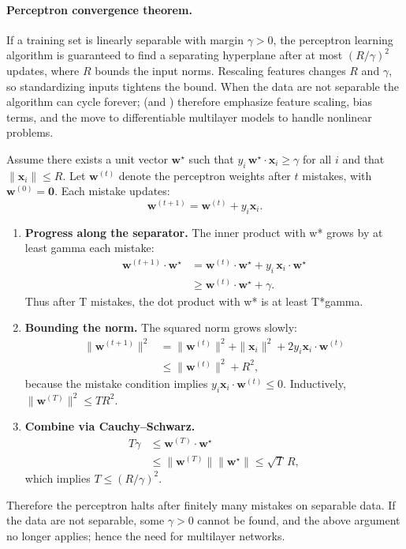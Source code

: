 \paragraph{Perceptron convergence theorem.} If a training set is linearly separable with margin \(\gamma > 0\), the perceptron learning algorithm is guaranteed to find a separating hyperplane after at most \((R/\gamma)^2\) updates, where \(R\) bounds the input norms. Rescaling features changes \(R\) and \(\gamma\), so standardizing inputs tightens the bound. When the data are not separable the algorithm can cycle forever;  (and ) therefore emphasize feature scaling, bias terms, and the move to differentiable multilayer models to handle nonlinear problems.

\begin{tcolorbox}[summarybox, title={Perceptron convergence theorem (proof sketch)}]
Assume there exists a unit vector \(\mathbf{w}^\star\) such that \(y_i\,\mathbf{w}^\star\!\cdot\!\mathbf{x}_i \ge \gamma\) for all \(i\) and that \(\|\mathbf{x}_i\|\le R\).
Let \(\mathbf{w}^{(t)}\) denote the perceptron weights after \(t\) mistakes, with \(\mathbf{w}^{(0)}=\mathbf{0}\). Each mistake updates:
\[
\mathbf{w}^{(t+1)} = \mathbf{w}^{(t)} + y_i \mathbf{x}_i.
\]
\begin{enumerate}
    \item \textbf{Progress along the separator.} The inner product with w* grows by at least gamma each mistake:
    \[
    \begin{aligned}
    \mathbf{w}^{(t+1)} \cdot \mathbf{w}^\star
    &= \mathbf{w}^{(t)} \cdot \mathbf{w}^\star + y_i\,\mathbf{x}_i \cdot \mathbf{w}^\star \\
    &\ge \mathbf{w}^{(t)} \cdot \mathbf{w}^\star + \gamma.
    \end{aligned}
    \]
    Thus after T mistakes, the dot product with w* is at least T*gamma.
    \item \textbf{Bounding the norm.} The squared norm grows slowly:
    \[
    \begin{aligned}
    \|\mathbf{w}^{(t+1)}\|^2
    &= \|\mathbf{w}^{(t)}\|^2 + \| \mathbf{x}_i\|^2 + 2 y_i \mathbf{x}_i \cdot \mathbf{w}^{(t)} \\
    &\le \|\mathbf{w}^{(t)}\|^2 + R^2,
    \end{aligned}
    \]
    because the mistake condition implies \(y_i \mathbf{x}_i \cdot \mathbf{w}^{(t)} \le 0\). Inductively, \(\|\mathbf{w}^{(T)}\|^2 \le TR^2\).
    \item \textbf{Combine via Cauchy--Schwarz.}
    \[
    \begin{aligned}
    T\gamma
    &\le \mathbf{w}^{(T)} \cdot \mathbf{w}^\star \\
    &\le \|\mathbf{w}^{(T)}\| \|\mathbf{w}^\star\|
    \le \sqrt{T}\, R,
    \end{aligned}
    \]
    which implies \(T \le (R/\gamma)^2\).
\end{enumerate}
Therefore the perceptron halts after finitely many mistakes on separable data. If the data are not separable, some \(\gamma > 0\) cannot be found, and the above argument no longer applies; hence the need for multilayer networks.
\end{tcolorbox}

